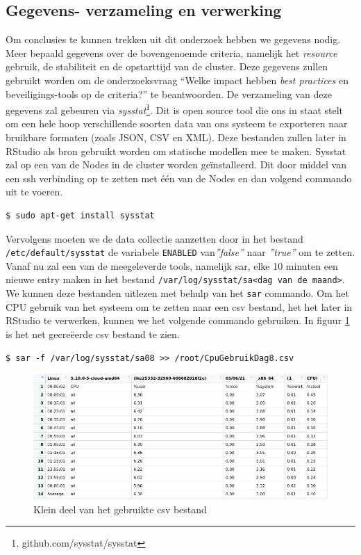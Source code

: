 \subsection{Gegevens- verzameling en verwerking} \label{ch:gegevens}
Om conclusies te kunnen trekken uit dit onderzoek hebben we gegevens nodig. Meer bepaald gegevens over de bovengenoemde criteria, namelijk het \textit{resource} gebruik, de stabiliteit en de opstarttijd van de cluster. Deze gegevens zullen gebruikt worden om de onderzoeksvraag ``Welke impact hebben \textit{best practices} en beveiligings-tools op de criteria?'' te beantwoorden. De verzameling van deze gegevens zal gebeuren via \textit{sysstat}\footnote{github.com/sysstat/sysstat}. Dit is open source tool die ons in staat stelt om een hele hoop verschillende soorten data van ons systeem te exporteren naar bruikbare formaten (zoals JSON, CSV en XML). Deze bestanden zullen later in RStudio als bron gebruikt worden om statische modellen mee te maken. Sysstat zal op een van de Nodes in de cluster worden geïnstalleerd. Dit door middel van een ssh verbinding op te zetten met één van de Nodes en dan volgend commando uit te voeren. 
\begin{verbatim} 
$ sudo apt-get install sysstat
\end{verbatim}

Vervolgens moeten we de data collectie aanzetten door in het bestand \verb|/etc/default/sysstat| de variabele \verb|ENABLED| van\textit{''false''} naar \textit{''true''} om te zetten. Vanaf nu zal een van de meegeleverde tools, namelijk sar, elke 10 minuten een nieuwe entry maken in het bestand \verb|/var/log/sysstat/sa<dag van de maand>|. We kunnen deze bestanden uitlezen met behulp van het \verb|sar| commando. Om het CPU gebruik van het systeem om te zetten naar een csv bestand, het het later in RStudio te verwerken, kunnen we het volgende commando gebruiken. In figuur \ref{fig:CPUDataPreview} is het net gecreëerde csv bestand te zien.

\begin{verbatim} 
$ sar -f /var/log/sysstat/sa08 >> /root/CpuGebruikDag8.csv
\end{verbatim}

\begin{figure}[h]
	\centering
	\includegraphics[width=\linewidth]{img/CPUDataPreview.png}
	\caption{Klein deel van het gebruikte csv bestand}
	\label{fig:CPUDataPreview}
\end{figure}

